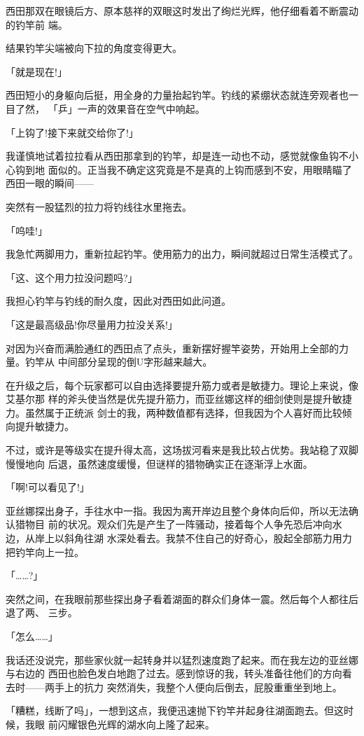 \documentclass[11pt]{book}
\begin{document}
西田那双在眼镜后方、原本慈祥的双眼这时发出了绚烂光辉，他仔细看着不断震动的钓竿前
端。

结果钓竿尖端被向下拉的角度变得更大。

「就是现在!」

西田短小的身躯向后挺，用全身的力量抬起钓竿。钓线的紧绷状态就连旁观者也一目了然，
「乒」一声的效果音在空气中响起。

「上钩了!接下来就交给你了!」

我谨慎地试着拉拉看从西田那拿到的钓竿，却是连一动也不动，感觉就像鱼钩不小心钩到地
面似的。正当我不确定这究竟是不是真的上钩而感到不安，用眼睛瞄了西田一眼的瞬间——

突然有一股猛烈的拉力将钓线往水里拖去。

「呜哇!」

我急忙两脚用力，重新拉起钓竿。使用筋力的出力，瞬间就超过日常生活模式了。

「这、这个用力拉没问题吗?」

我担心钓竿与钓线的耐久度，因此对西田如此问道。

「这是最高级品!你尽量用力拉没关系!」

对因为兴奋而满脸通红的西田点了点头，重新摆好握竿姿势，开始用上全部的力量。钓竿从
中间部分呈现的倒U字形越来越大。

在升级之后，每个玩家都可以自由选择要提升筋力或者是敏捷力。理论上来说，像艾基尔那
样的斧头使当然是优先提升筋力，而亚丝娜这样的细剑使则是提升敏捷力。虽然属于正统派
剑士的我，两种数值都有选择，但我因为个人喜好而比较倾向提升敏捷力。

不过，或许是等级实在提升得太高，这场拔河看来是我比较占优势。我站稳了双脚慢慢地向
后退，虽然速度缓慢，但谜样的猎物确实正在逐渐浮上水面。

「啊!可以看见了!」

亚丝娜探出身子，手往水中一指。我因为离开岸边且整个身体向后仰，所以无法确认猎物目
前的状况。观众们先是产生了一阵骚动，接着每个人争先恐后冲向水边，从岸上以斜角往湖
水深处看去。我禁不住自己的好奇心，股起全部筋力用力把钓竿向上一拉。

「……?」

突然之间，在我眼前那些探出身子看着湖面的群众们身体一震。然后每个人都往后退了两、
三步。

「怎么……」

我话还没说完，那些家伙就一起转身并以猛烈速度跑了起来。而在我左边的亚丝娜与右边的
西田也脸色发白地跑了过去。感到惊讶的我，转头准备往他们的方向看去时——两手上的抗力
突然消失，我整个人便向后倒去，屁股重重坐到地上。

「糟糕，线断了吗」，一想到这点，我便迅速抛下钓竿并起身往湖面跑去。但这时候，我眼
前闪耀银色光辉的湖水向上隆了起来。
\end{document}
